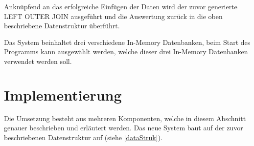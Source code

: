 \documentclass[draft,final]{vutinfth} %
\begin{document}
Anknüpfend an das erfolgreiche Einfügen der Daten wird der zuvor generierte LEFT OUTER JOIN ausgeführt und die Auswertung zurück in die oben beschriebene Datenstruktur überführt. 

Das System beinhaltet drei verschiedene In-Memory Datenbanken, beim Start des Programms kann ausgewählt werden, welche dieser drei In-Memory Datenbanken verwendet werden soll.

\section{Implementierung}
Die Umsetzung besteht aus mehreren Komponenten, welche in diesem Abschnitt genauer beschrieben und erläutert werden. Das neue System baut auf der zuvor beschriebenen Datenstruktur auf (siehe \ref{dataStruk}).
\end{document}
